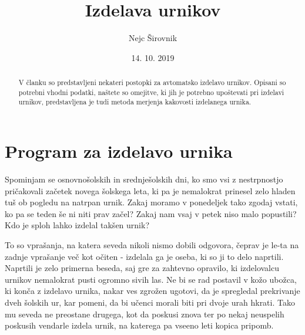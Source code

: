 \documentclass[a4paper,10pt]{article}
\begin{document}
 





\title{Izdelava urnikov}
\author{Nejc Širovnik}
\date{14. 10. 2019}
\maketitle



\begin{abstract}
   V članku so predstavljeni nekateri postopki za avtomatsko izdelavo urnikov. Opisani so
potrebni vhodni podatki, naštete so omejitve, ki jih je potrebno upoštevati pri izdelavi
urnikov, predstavljena je tudi metoda merjenja kakovosti izdelanega urnika.
\end{abstract}

\tableofcontents


\section{Program za izdelavo urnika}

Spominjam se osnovnošolskih in srednješolskih dni, ko smo vsi z nestrpnostjo pričakovali
začetek novega šolskega leta, ki pa je nemalokrat prinesel zelo hladen tuš ob pogledu na
natrpan urnik. Zakaj moramo v ponedeljek tako zgodaj vstati, ko pa se teden še ni niti
prav začel? Zakaj nam vsaj v petek niso malo popustili? Kdo je sploh lahko izdelal
takšen urnik?

To so vprašanja, na katera seveda nikoli nismo dobili odgovora, čeprav je le-ta na zadnje
vprašanje več kot očiten - izdelala ga je oseba, ki so ji to delo naprtili. Naprtili je
zelo primerna beseda, saj gre za zahtevno opravilo, ki izdelovalcu urnikov nemalokrat
pusti ogromno sivih las. Ne bi se rad postavil v kožo ubožca, ki konča z izdelavo urnika,
nakar ves zgrožen ugotovi, da je spregledal prekrivanje dveh šolskih ur, kar pomeni, da
bi učenci morali biti pri dvoje urah hkrati. Tako mu seveda ne preostane drugega, kot da
poskusi znova ter po nekaj neuspelih poskusih vendarle izdela urnik, na katerega pa vseeno
leti kopica pripomb.
\end{document}
